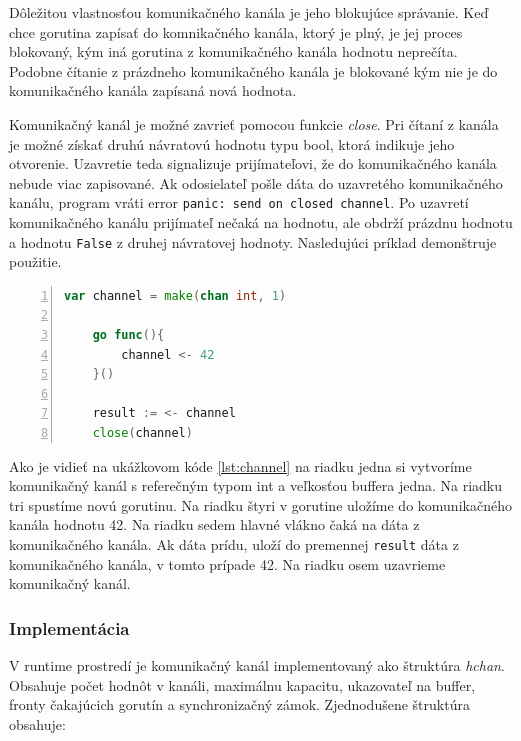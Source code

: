 \documentclass[
  biblatex,
  seconds=true,
  language=slovak,
  figures=false,
  urldate=iso,
  glossaries,
  index
]{kidiplom}
\begin{document}
Dôležitou vlastnosťou komunikačného kanála je jeho blokujúce správanie. Keď chce gorutina zapísať do komnikačného kanála, ktorý je plný, je jej proces
blokovaný, kým iná gorutina z komunikačného kanála hodnotu neprečíta. Podobne čítanie z prázdneho komunikačného kanála je blokované kým nie je do
komunikačného kanála zapísaná nová hodnota.

Komunikačný kanál je možné zavrieť pomocou funkcie \emph{close}.
Pri čítaní z kanála je možné získať druhú návratovú hodnotu typu bool, ktorá indikuje jeho otvorenie.
Uzavretie teda signalizuje prijímateľovi, že do komunikačného kanála nebude viac zapisované. Ak odosielateľ pošle dáta do
uzavretého komunikačného kanálu,
program vráti error \texttt{panic: send on closed channel}. Po uzavretí komunikačného kanálu prijímateľ nečaká na hodnotu,
ale obdrží prázdnu hodnotu a hodnotu \texttt{False} z druhej návratovej hodnoty.
Nasledujúci príklad demonštruje použitie.
\begin{lstlisting}[language=Go, numbers=left, caption={Použitie komunikačného kanála}, captionpos=b, label={lst:channel}]
    var channel = make(chan int, 1)

    go func(){
        channel <- 42
    }()

    result := <- channel
    close(channel)
\end{lstlisting}
Ako je vidieť na ukážkovom kóde \ref{lst:channel} na riadku jedna si vytvoríme komunikačný kanál s referečným typom int a veľkosťou buffera jedna. Na riadku tri spustíme novú gorutinu.
Na riadku štyri v gorutine uložíme do komunikačného kanála hodnotu 42. Na riadku sedem hlavné vlákno čaká na dáta z komunikačného kanála. Ak dáta prídu,
uloží do premennej \texttt{result} dáta z komunikačného kanála, v tomto prípade 42. Na riadku osem uzavrieme komunikačný kanál.

\subsubsection{Implementácia}
V runtime prostredí je komunikačný kanál implementovaný ako štruktúra \emph{hchan}. Obsahuje počet hodnôt v kanáli, maximálnu
kapacitu, ukazovateľ na buffer, fronty čakajúcich gorutín a synchronizačný zámok. Zjednodušene štruktúra obsahuje:
\end{document}

